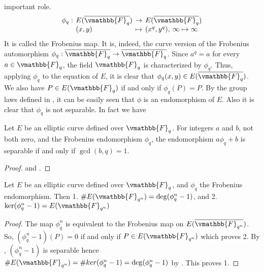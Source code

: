 important role.
\begin{equation}
\label{equation:Frobenius}
\setlength\arraycolsep{2pt}
\begin{array}{llll}
\phi_q: & E(\overline{\vmathbb{F}_q}) & \rightarrow & E(\overline{\vmathbb{F}_q}) \\
& (x, y) & \mapsto & (x^q, y^q), \: \infty \mapsto \infty
\end{array}
\end{equation}
It is called the Frobenius map. It is, indeed, the curve version of the Frobenius automorphism 
$\phi_q: \overline{\vmathbb{F}_q} \rightarrow \overline{\vmathbb{F}_q}$. Since $a^q = a$ for every $a 
\in \vmathbb{F}_q$, the field $\vmathbb{F}_q$ is characterized by $\phi_q$. Thus, applying $\phi_q$ to 
the equation of $E$, it is clear that $\phi_q(x, y) \in E(\overline{\vmathbb{F}_q})$. We also have $P 
\in E(\vmathbb{F}_q)$ if and only if $\phi_q(P) = P$. By the group laws defined in 
, it can be easily seen that $\phi$ is an endomorphism of $E$. Also 
it is clear that $\phi_q$ is not separable. In fact we have
\begin{corollary}
\label{corollary:Frob-sep}
Let $E$ be an elliptic curve defined over $\vmathbb{F}_q$. For integers $a$ and $b$, not both zero, 
and the Frobenius endomorphism $\phi_q$, the endomorphism $a\phi_q + b$ is separable if and only if 
$\gcd(b, q) = 1$.
\end{corollary}
\begin{proof}
 and .
\end{proof}
\begin{proposition}
\label{proposition:Frob-ker-E}
Let $E$ be an elliptic curve defined over $\vmathbb{F}_q$, and $\phi_q$ the Frobenius endomorphism. 
Then 1. $\#E(\vmathbb{F}_{q^n}) = \deg(\phi_q^n - 1)$, and 2. $\ker(\phi_q^n - 1) = 
E(\vmathbb{F}_{q^n})$
\end{proposition}
\begin{proof}
The map $\phi_q^n$ is equivalent to the Frobenius map on $E(\overline{\vmathbb{F}_{q^n}})$. So, 
$(\phi_q^n - 1)(P) = 0$ if and only if $P \in E(\vmathbb{F}_{q^n})$ which proves 2. By 
, $(\phi_q^n - 1)$ is separable hence $\#E(\vmathbb{F}_{q^n}) = 
\#ker(\phi_q^n - 1) = \deg(\phi_q^n - 1)$ by . This proves 1.
\end{proof}









